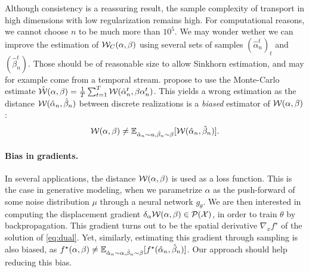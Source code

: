 Although consistency is a reassuring
result, the sample complexity of transport in high dimensions with low
regularization remains high. For computational reasons, we cannot choose $n$ to
be much more than $10^5$. We may wonder wether we can improve the estimation of
$\mathcal{W}_{C}(\alpha,\beta)$ using several sets of samples $(\hat \alpha_n^t)_t$ and
$(\hat \beta_n^t)$. Those should be of reasonable size to allow Sinkhorn
estimation, and may for example come from a temporal stream.
\citet{2018-Genevay-aistats} propose to use the Monte-Carlo estimate $\hat
{\mathcal{W}}(\alpha, \beta) = \frac{1}{T} \sum_{t=1}^T \mathcal{W}(\hat \alpha_n^t, \beta
\alpha_n^t)$. This yields a wrong estimation as the distance $\mathcal{W}(\hat
\alpha_n, \hat \beta_n)$ between discrete realizations is a \textit{biased}
estimator of $\mathcal{W}(\alpha, \beta)$:
\begin{equation}
    \mathcal{W}(\alpha, \beta) \neq 
    \mathbb{E}_{\hat \alpha_n \sim \alpha, \hat \beta_n \sim \beta} [\mathcal{W}(\hat \alpha_n, \hat \beta_n)].
\end{equation}

\paragraph{Bias in gradients.} In several applications, the distance
$\mathcal{W}(\alpha, \beta)$ is used as a loss function. This is the case in generative
modeling, when we parametrize $\alpha$ as the push-forward of some noise
distribution $\mu$ through a neural network $g_\theta$. We are then interested
in computing the displacement gradient $\delta_\alpha \mathcal{W}(\alpha, \beta) \in
\mathcal{P}(\mathcal{X})$, in order to train $\theta$ by backpropagation. This gradient turns
out to be the spatial derivative $\nabla_x f^\star$ of the solution of
\eqref{eq:dual}. Yet, similarly, estimating this gradient through sampling is
also biased, as $f^\star(\alpha, \beta) \neq \mathbb{E}_{\hat \alpha_n \sim \alpha,
\hat \beta_n \sim \beta}[f^\star(\hat \alpha_n, \hat \beta_n)]$.  Our approach
should help reducing this bias.